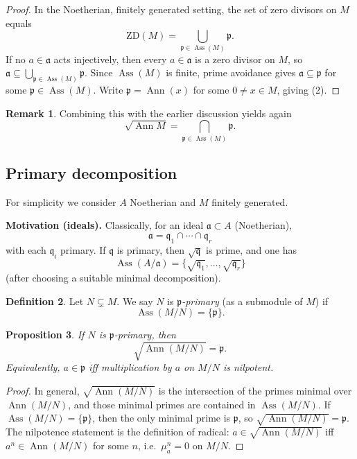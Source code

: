 \documentclass[11pt,a4paper]{article}
\theoremstyle{definition}
\newtheorem{definition}{Definition}[section]
\newtheorem{remark}[definition]{Remark}
\theoremstyle{plain}
\newtheorem{proposition}[definition]{Proposition}
\theoremstyle{remark}
\newcommand{\Ann}{\operatorname{Ann}}
\newcommand{\Ass}{\operatorname{Ass}}
\begin{document}
\begin{proof}
In the Noetherian, finitely generated setting, the set of zero divisors on $M$ equals
\[
\mathrm{ZD}(M)=\bigcup_{\mathfrak{p}\in \Ass(M)} \mathfrak{p}.
\]
If no $a\in \mathfrak{a}$ acts injectively, then every $a\in \mathfrak{a}$ is a zero divisor on $M$,
so $\mathfrak{a}\subseteq \bigcup_{\mathfrak{p}\in \Ass(M)}\mathfrak{p}$.
Since $\Ass(M)$ is finite, prime avoidance gives $\mathfrak{a}\subseteq \mathfrak{p}$ for some $\mathfrak{p}\in \Ass(M)$.
Write $\mathfrak{p}=\Ann(x)$ for some $0\neq x\in M$, giving (2).
\end{proof}

\begin{remark}
Combining this with the earlier discussion yields again
\[
\sqrt{\Ann M}=\bigcap_{\mathfrak{p}\in \Ass(M)}\mathfrak{p}.
\]
\end{remark}


\subsection{Primary decomposition}
For simplicity we consider $A$ Noetherian and $M$ finitely generated. 

\textbf{Motivation (ideals).} Classically, for an ideal $\mathfrak{a}\subset A$ (Noetherian),
\[
\mathfrak{a}=\mathfrak{q}_1\cap \cdots \cap \mathfrak{q}_r
\]
with each $\mathfrak{q}_i$ primary. If $\mathfrak{q}$ is primary, then $\sqrt{\mathfrak{q}}$ is prime,
and one has
\[
\Ass(A/\mathfrak{a})=\{\sqrt{\mathfrak{q}_1},\dots,\sqrt{\mathfrak{q}_r}\}
\]
(after choosing a suitable minimal decomposition).

\begin{definition}
Let $N\subsetneq M$. We say $N$ is \emph{$\mathfrak{p}$-primary} (as a submodule of $M$) if
\[
\Ass(M/N)=\{\mathfrak{p}\}.
\]
\end{definition}

\begin{proposition}
If $N$ is $\mathfrak{p}$-primary, then
\[
\sqrt{\Ann(M/N)}=\mathfrak{p}.
\]
Equivalently, $a\in \mathfrak{p}$ iff multiplication by $a$ on $M/N$ is nilpotent.
\end{proposition}

\begin{proof}
In general, $\sqrt{\Ann(M/N)}$ is the intersection of the primes minimal over $\Ann(M/N)$, and those minimal primes
are contained in $\Ass(M/N)$. If $\Ass(M/N)=\{\mathfrak{p}\}$, then the only minimal prime is $\mathfrak{p}$,
so $\sqrt{\Ann(M/N)}=\mathfrak{p}$. The nilpotence statement is the definition of radical: $a\in \sqrt{\Ann(M/N)}$
iff $a^n\in \Ann(M/N)$ for some $n$, i.e.\ $\mu_a^n=0$ on $M/N$.
\end{proof}
\end{document}
